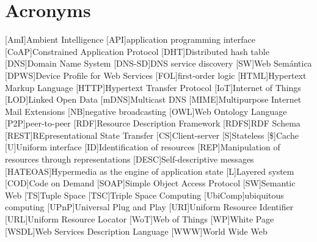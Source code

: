 


\chapter*{Acronyms}

\begin{acronym}
  [AmI]{Ambient Intelligence}
  [API]{application programming interface}
  [CoAP]{Constrained Application Protocol}
  [DHT]{Distributed hash table}
  [DNS]{Domain Name System}
  [DNS-SD]{DNS service discovery}
  [SW]{Web Semántica}
  [DPWS]{Device Profile for Web Services}
  [FOL]{first-order logic}
  [HTML]{Hypertext Markup Language}
  [HTTP]{Hypertext Transfer Protocol}
  [IoT]{Internet of Things}
  [LOD]{Linked Open Data}
  [mDNS]{Multicast DNS}
  [MIME]{Multipurpose Internet Mail Extensions}
  [NB]{negative broadcasting}
  [OWL]{Web Ontology Language}
  [P2P]{peer-to-peer}
  [RDF]{Resource Description Framework}
  [RDFS]{RDF Schema}
  [REST]{REpresentational State Transfer} %
    [CS]{Client-server}
    [S]{Stateless}
    [\$]{Cache}
    [U]{Uniform interface}
    [ID]{Identification of resources}
    [REP]{Manipulation of resources through representations}
    [DESC]{Self-descriptive messages}
    [HATEOAS]{Hypermedia as the engine of application state}
    [L]{Layered system}
    [COD]{Code on Demand} %
  [SOAP]{Simple Object Access Protocol}
  [SW]{Semantic Web}
  [TS]{Tuple Space}
  [TSC]{Triple Space Computing}
  [UbiComp]{ubiquitous computing}
  [UPnP]{Universal Plug and Play}
  [URI]{Uniform Resource Identifier}
  [URL]{Uniform Resource Locator}
  [WoT]{Web of Things}
  [WP]{White Page}
  [WSDL]{Web Services Description Language}
  [WWW]{World Wide Web} %
\end{acronym}

